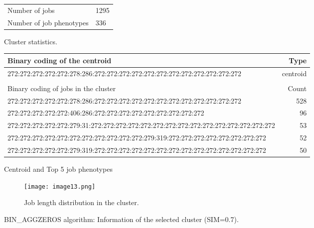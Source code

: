 \documentclass{jhps}
\begin{document}
\begin{cluster}
	\begin{subtable}{\textwidth}
		\centering
		\begin{tabular}{ll}
			\centering
			Number of jobs & 1295 \\
			Number of job phenotypes & 336 \\
		\end{tabular}
		\caption{Cluster statistics.}
		\label{cluster:bin_aggzeros:stats}
	\end{subtable}
	\medskip
	\begin{subtable}{\textwidth}
		\centering
		\begin{tiny}
			\begin{tabular}{l|r}
				\rowcolor{tblhead}
				Binary coding of the centroid                                                                         &  Type     \\
				\hline
				272:272:272:272:272:278:286:272:272:272:272:272:272:272:272:272:272:272:272            &  centroid \\
				\multicolumn{2}{l}{}                                                                   \\
				\hline
				\rowcolor{tblhead}
				Binary coding of jobs in the cluster                                                                          &  Count    \\
				272:272:272:272:272:278:286:272:272:272:272:272:272:272:272:272:272:272:272            &  528      \\
				272:272:272:272:272:406:286:272:272:272:272:272:272:272:272:272                        &  96       \\
				272:272:272:272:272:279:31:272:272:272:272:272:272:272:272:272:272:272:272:272:272:272 &  53       \\
				272:272:272:272:272:272:272:272:272:272:272:279:319:272:272:272:272:272:272:272:272    &  52       \\
				272:272:272:272:272:279:319:272:272:272:272:272:272:272:272:272:272:272:272:272:272    &  50       \\
			\end{tabular}
		\end{tiny}
		\caption{Centroid and Top 5 job phenotypes}
		\label{cluster:bin_aggzeros:top_jobs}
	\end{subtable}
	\medskip
	\begin{subfigure}{\textwidth}
		\centering
		\texttt{[image: image13.png]}
		\caption{Job length distribution in the cluster.}
		\label{cluster:bin_aggzeros:length}
	\end{subfigure}
	\caption{BIN\_AGGZEROS algorithm: Information of the selected cluster (SIM=0.7).}
	\label{cluster:bin_aggzeros}
\end{cluster}
\end{document}
